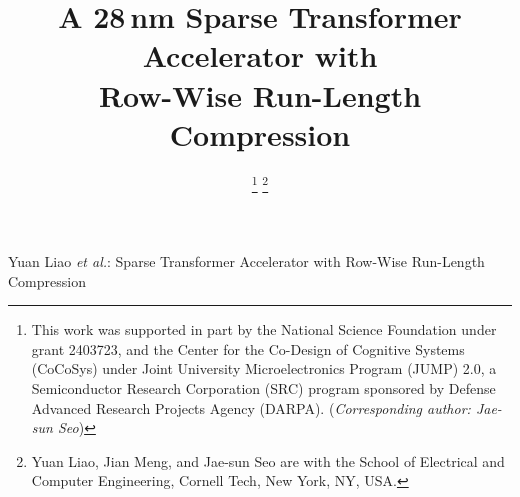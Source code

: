 \documentclass[lettersize,journal]{IEEEtran}
\begin{document}

\title{A 28\,nm Sparse Transformer Accelerator with \\Row-Wise Run-Length Compression}

\author{
\thanks{
This work was supported in part by the National Science Foundation under grant 2403723, and the Center for the Co-Design of Cognitive Systems (CoCoSys) under Joint University Microelectronics Program (JUMP) 2.0, a Semiconductor Research Corporation (SRC) program sponsored by Defense Advanced Research Projects Agency (DARPA). (\textit{Corresponding author: Jae-sun Seo})}
\thanks{Yuan Liao, Jian Meng, and Jae-sun Seo are with the School of Electrical and Computer Engineering, Cornell Tech, New York, NY, USA.}}

%
{Yuan Liao \MakeLowercase{\textit{et al.}}: Sparse Transformer Accelerator with Row-Wise Run-Length Compression}

\maketitle
\end{document}
